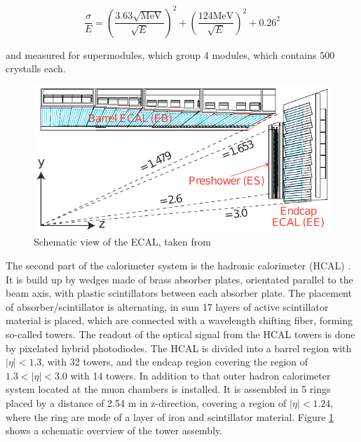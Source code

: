 \begin{equation}
	\label{eq:eq_2_4}
	\frac{\sigma}{E} = (\frac{3.63 \sqrt{\text{MeV}}}{\sqrt{E}})^2 + (\frac{124 \text{MeV}}{\sqrt{E}})^2 + 0.26^{2}
\end{equation}

and measured for supermodules, which group 4 modules, which contains 500 crystalls each. \\

\begin{figure}[ht]
	\centering
	\includegraphics[width=1\textwidth]{pictures/CMS_ElectromagneticCalorimeter.pdf}

	\caption[Electromagnetic calorimeter of CMS]{Schematic view of the \gls{ECAL}, taken from \cite{CMS2}}
	\label{fig:fig_2_8}
\end{figure}

The second part of the calorimeter system is the hadronic calorimeter (\gls{HCAL}) \cite{CMS2, HCAL}. It is build up by wedges made of brass absorber plates, orientated parallel to the beam axis, with plastic scintillators between each absorber plate. The placement of absorber/scintillator is alternating, in sum 17 layers of active scintillator material is placed, which are connected with a wavelength shifting fiber, forming so-called towers. The readout of the optical signal from the HCAL towers is done by pixelated hybrid photodiodes. The \gls{HCAL} is divided into a barrel region with $|\eta| < 1.3$, with 32 towers, and the endcap region covering the region of $1.3 <|\eta| < 3.0$ with 14 towers. In addition to that outer hadron calorimeter system located at the muon chambers is installed. It is assembled in 5 rings placed by a distance of 2.54 m in z-direction, covering a region of $|\eta| < 1.24$, where the ring are mode of a layer of iron and scintillator material. Figure \ref{fig:fig_2_8} shows a schematic overview of the tower assembly. \\

